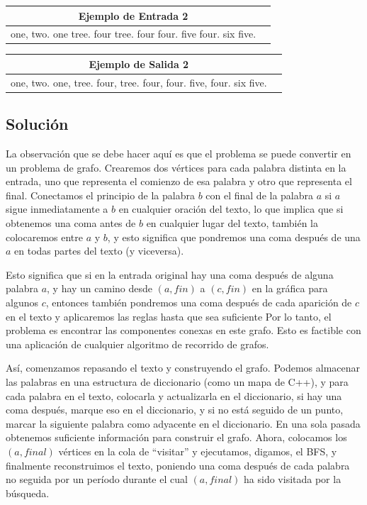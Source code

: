 \documentclass[12pt]{article}
\newcommand{\nl}{\vspace{0.3cm}}
\begin{document}
\begin{center}
	
	\nl
	
	\begin{tabular}{|c|c|}
		\hline Ejemplo de Entrada 2\\ 
		\hline one, two. one tree. four tree. four four. five four. six five.\\
		\hline 
	\end{tabular} 
	
	\nl
	
	\begin{tabular}{|c|c|}
		\hline Ejemplo de Salida 2\\ 
		\hline one, two. one, tree. four, tree. four, four. five, four. six five.\\ 
		\hline 
	\end{tabular} 
	
\end{center}

\subsection{Solución}

La observación que se debe hacer aquí es que el problema se puede convertir en un problema de grafo. Crearemos dos vértices para cada palabra distinta en la entrada, uno que representa el comienzo de esa palabra y otro que representa el final. Conectamos el principio de la palabra $b$ con el final de la palabra $a$ si $a$ sigue inmediatamente a $b$ en cualquier oración del texto, lo que implica que si obtenemos una coma antes de $b$ en cualquier lugar del texto, también la colocaremos entre $a$ y $b$, y esto significa que pondremos una coma después de una $a$ en todas partes del texto (y viceversa).

\nl

Esto significa que si en la entrada original hay una coma después de alguna palabra $a$, y hay un camino desde $(a, fin)$ a $(c, fin)$ en la gráfica para algunos $c$, entonces también pondremos una coma después de cada aparición de $c$ en el texto y aplicaremos las reglas hasta que sea suficiente Por lo tanto, el problema es encontrar las componentes conexas en este grafo. Esto es factible con una aplicación de cualquier algoritmo de recorrido de grafos.

\nl

Así, comenzamos repasando el texto y construyendo el grafo. Podemos almacenar las palabras en una estructura de diccionario (como un mapa de C++), y para cada palabra en el texto, colocarla y actualizarla en el diccionario, si hay una coma después, marque eso en el diccionario, y si no está seguido de un punto, marcar la siguiente palabra como adyacente en el diccionario. En una sola pasada obtenemos suficiente información para construir el grafo. Ahora, colocamos los $(a, final)$ vértices en la cola de “visitar” y ejecutamos, digamos, el BFS, y finalmente reconstruimos el texto, poniendo una coma después de cada palabra no seguida por un período durante el cual $(a, final)$ ha sido visitada por la búsqueda.
\end{document}

